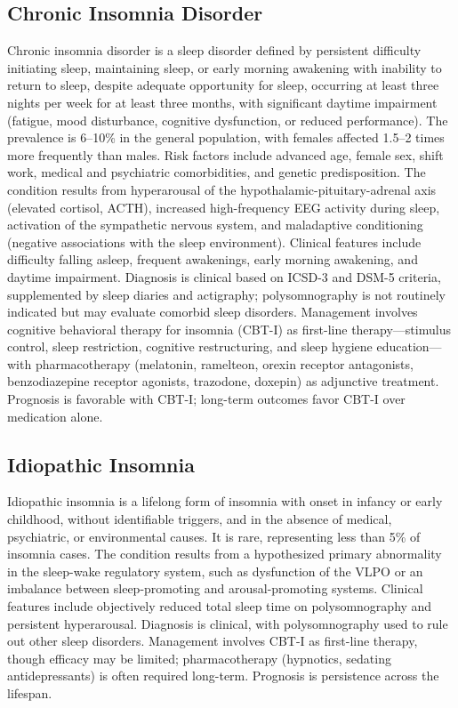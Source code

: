 \subsection{Chronic Insomnia Disorder}
\label{sec:Chronic Insomnia Disorder}
Chronic insomnia disorder is a sleep disorder defined by persistent difficulty initiating sleep, maintaining sleep, or early morning awakening with inability to return to sleep, despite adequate opportunity for sleep, occurring at least three nights per week for at least three months, with significant daytime impairment (fatigue, mood disturbance, cognitive dysfunction, or reduced performance). The prevalence is 6--10\% in the general population, with females affected 1.5--2 times more frequently than males. Risk factors include advanced age, female sex, shift work, medical and psychiatric comorbidities, and genetic predisposition. The condition results from hyperarousal of the hypothalamic-pituitary-adrenal axis (elevated cortisol, ACTH), increased high-frequency EEG activity during sleep, activation of the sympathetic nervous system, and maladaptive conditioning (negative associations with the sleep environment). Clinical features include difficulty falling asleep, frequent awakenings, early morning awakening, and daytime impairment. Diagnosis is clinical based on ICSD-3 and DSM-5 criteria, supplemented by sleep diaries and actigraphy; polysomnography is not routinely indicated but may evaluate comorbid sleep disorders. Management involves cognitive behavioral therapy for insomnia (CBT-I) as first-line therapy---stimulus control, sleep restriction, cognitive restructuring, and sleep hygiene education---with pharmacotherapy (melatonin, ramelteon, orexin receptor antagonists, benzodiazepine receptor agonists, trazodone, doxepin) as adjunctive treatment. Prognosis is favorable with CBT-I; long-term outcomes favor CBT-I over medication alone.

\subsection{Idiopathic Insomnia}
\label{sec:Idiopathic Insomnia}
Idiopathic insomnia is a lifelong form of insomnia with onset in infancy or early childhood, without identifiable triggers, and in the absence of medical, psychiatric, or environmental causes. It is rare, representing less than 5\% of insomnia cases. The condition results from a hypothesized primary abnormality in the sleep-wake regulatory system, such as dysfunction of the VLPO or an imbalance between sleep-promoting and arousal-promoting systems. Clinical features include objectively reduced total sleep time on polysomnography and persistent hyperarousal. Diagnosis is clinical, with polysomnography used to rule out other sleep disorders. Management involves CBT-I as first-line therapy, though efficacy may be limited; pharmacotherapy (hypnotics, sedating antidepressants) is often required long-term. Prognosis is persistence across the lifespan.

